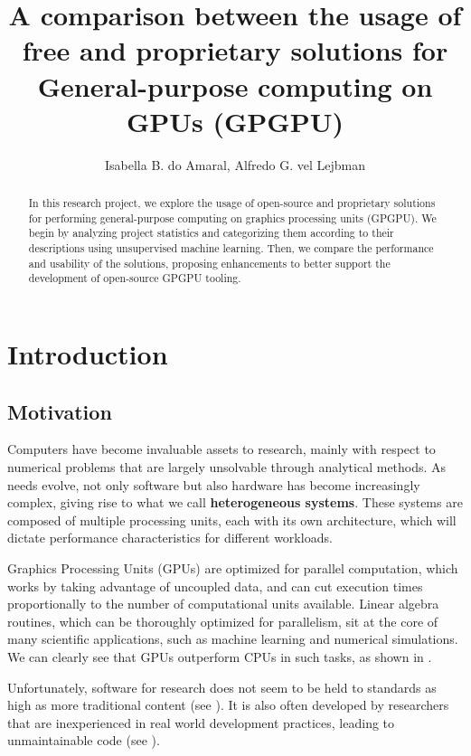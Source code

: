 \documentclass[12pt]{article}
\title{A comparison between the usage of free and proprietary solutions for General-purpose computing on GPUs (GPGPU)}
\author{Isabella B. do Amaral\inst{1}, Alfredo G. vel Lejbman\inst{2}}
\begin{document}
\maketitle

\begin{abstract}
    In this research project, we explore the usage of open-source and proprietary
    solutions for performing general-purpose computing on graphics processing
    units (GPGPU).
    We begin by analyzing project statistics and categorizing them according to
    their descriptions using unsupervised machine learning.
    Then, we compare the performance and usability of the solutions, proposing
    enhancements to better support the development of open-source GPGPU
    tooling.
\end{abstract}

\section{Introduction} \label{sec:intro}

\subsection{Motivation} \label{sec:intro:motivation}

Computers have become invaluable assets to research, mainly with respect to
numerical problems that are largely unsolvable through analytical methods.
As needs evolve, not only software but also hardware has become increasingly
complex, giving rise to what we call \textbf{heterogeneous systems}.
These systems are composed of multiple processing units, each with its own
architecture, which will dictate performance characteristics for different
workloads.

Graphics Processing Units (GPUs) are optimized for parallel computation, which
works by taking advantage of uncoupled data, and can cut execution times
proportionally to the number of computational units available.
Linear algebra routines, which can be thoroughly optimized for parallelism, sit
at the core of many scientific applications, such as machine learning and
numerical simulations.
We can clearly see that GPUs outperform CPUs in such tasks, as shown in
\cite{buber2018performance}.

Unfortunately, software for research does not seem to be held to standards as
high as more traditional content (see \cite{sufi2014software}).
It is also often developed by researchers that are inexperienced in real
world development practices, leading to unmaintainable code (see
\cite{carver2022survey}).
\end{document}

